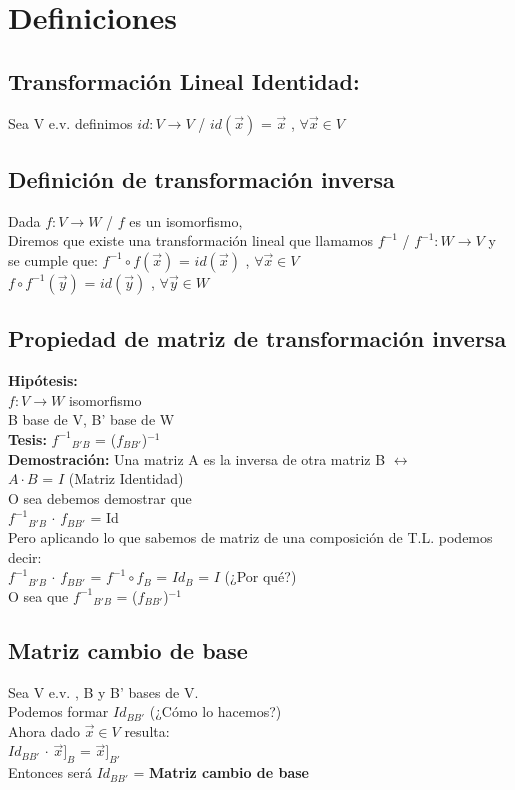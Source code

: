 \documentclass[11pt]{article}
\begin{document}
\section{Definiciones}
\subsection{Transformación Lineal Identidad:}
Sea V e.v. definimos $id: V \rightarrow V$ / $id(\vec{x})$ = $\vec{x}$ , $\forall \vec{x} \in V$
\subsection{Definición de transformación inversa}
Dada $f : V \rightarrow W$ / $f$ es un isomorfismo,\\
Diremos que existe una transformación lineal que llamamos $f^{-1}$ / $f^{-1} : W \rightarrow V$ y se cumple que:
$f^{-1} \circ f (\vec{x})$ = $id(\vec{x})$ , $\forall \vec{x} \in V$ \\
$f \circ f^{-1} (\vec{y})$ = $id(\vec{y})$ , $\forall \vec{y} \in W$
\subsection{Propiedad de matriz de transformación inversa}
{\bfseries {Hipótesis:}} \\
$f : V \rightarrow W$ isomorfismo \\
B base de V, B' base de W \\
{\bfseries {Tesis:}}
\textbardbl $f^{-1}$\textbardbl$_{B'B}$ = 
(\textbardbl $f$\textbardbl$_{BB'}$)$^{-1}$ \\
{\bfseries {Demostración:}} Una matriz A es la inversa de otra matriz B $\leftrightarrow$ \\
$A \cdot B$ = $I$ (Matriz Identidad)\\
O sea debemos demostrar que \\
\textbardbl $f^{-1}$\textbardbl$_{B'B}$ 
$\cdot$ 
\textbardbl $f$\textbardbl$_{BB'}$ = Id \\
Pero aplicando lo que sabemos de matriz de una composición de T.L. podemos decir: \\
\textbardbl $f^{-1}$\textbardbl$_{B'B}$ 
$\cdot$ 
\textbardbl $f$\textbardbl$_{BB'}$ =
\textbardbl $f^{-1} \circ f$\textbardbl$_{B}$ = 
\textbardbl $Id$\textbardbl$_{B}$ = $I$ (¿Por qué?) \\
O sea que 
\textbardbl $f^{-1}$\textbardbl$_{B'B}$ = 
(\textbardbl $f$\textbardbl$_{BB'}$)$^{-1}$
\subsection{Matriz cambio de base}
Sea V e.v. , B y B’ bases de V. \\
Podemos formar \textbardbl $Id$\textbardbl$_{BB'}$ (¿Cómo lo hacemos?) \\
Ahora dado $\vec{x} \in V$ resulta: \\
\textbardbl $Id$\textbardbl$_{BB'}$ 
$\cdot$ $\vec{x}]_{B}$ = $\vec{x}]_{B'}$ \\
Entonces será \textbardbl $Id$\textbardbl$_{BB'}$ = 
{\bfseries{Matriz cambio de base}}
\end{document}
